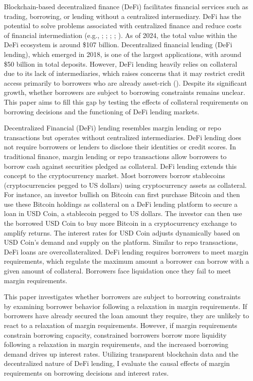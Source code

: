 \documentclass[12pt]{article}
\begin{document}
Blockchain-based decentralized finance (DeFi) facilitates financial services such as trading, borrowing, or lending without a centralized intermediary. DeFi has the potential to solve problems associated with centralized finance and reduce costs of financial intermediation (e.g., \citealp{yermack2017corporate}; \citealp{chiu2019blockchain}; \citealp{cong2019blockchain}; \citealp{harvey2021defi}; \citealp{TheRapidGrowthofFintech}). As of 2024, the total value within the DeFi ecosystem is around \$107 billion. Decentralized financial lending (DeFi lending), which emerged in 2018, is one of the largest applications, with around \$50 billion in total deposits. However, DeFi lending heavily relies on collateral due to its lack of intermediaries, which raises concerns that it may restrict credit access primarily to borrowers who are already asset-rich (\citealp{aramonte2022defi}). Despite its significant growth, whether borrowers are subject to borrowing constraints remains unclear. This paper aims to fill this gap by testing the effects of collateral requirements on borrowing decisions and the functioning of DeFi lending markets.

Decentralized Financial (DeFi) lending resembles margin lending or repo transactions but operates without centralized intermediaries. DeFi lending does not require borrowers or lenders to disclose their identities or credit scores. In traditional finance, margin lending or repo transactions allow borrowers to borrow cash against securities pledged as collateral. DeFi lending extends this concept to the cryptocurrency market. Most borrowers borrow stablecoins (cryptocurrencies pegged to US dollars) using cryptocurrency assets as collateral. For instance, an investor bullish on Bitcoin can first purchase Bitcoin and then use these Bitcoin holdings as collateral on a DeFi lending platform to secure a loan in USD Coin, a stablecoin pegged to US dollars. The investor can then use the borrowed USD Coin to buy more Bitcoin in a cryptocurrency exchange to amplify returns. The interest rates for USD Coin adjusts dynamically based on USD Coin's demand and supply on the platform. Similar to repo transactions, DeFi loans are overcollateralized. DeFi lending requires borrowers to meet margin requirements, which regulate the maximum amount a borrower can borrow with a given amount of collateral. Borrowers face liquidation once they fail to meet margin requirements.


This paper investigates whether borrowers are subject to borrowing constraints by examining borrower behavior following a relaxation in margin requirements. If borrowers have already secured the loan amount they require, they are unlikely to react to a relaxation of margin requirements. However, if margin requirements constrain borrowing capacity, constrained borrowers borrow more liquidity following a relaxation in margin requirements, and the increased borrowing demand drives up interest rates. Utilizing transparent blockchain data and the decentralized nature of DeFi lending, I evaluate the causal effects of margin requirements on borrowing decisions and interest rates.
\end{document}
